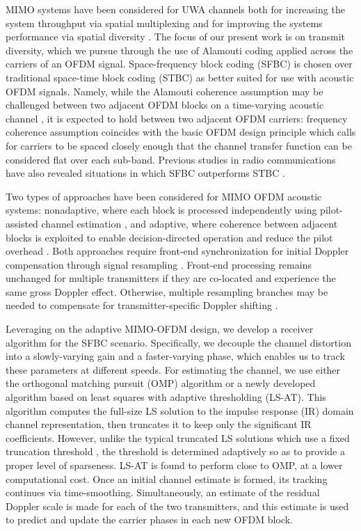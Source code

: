 MIMO systems have been considered for UWA channels both for increasing the system throughput via spatial multiplexing \cite{LiHu-MIMOOFDMhighrate, St-MIMOOFDMUWA} and for improving the systems performance via spatial diversity
\cite{LiSt-stbc}. The focus of our present work is on transmit diversity, which we pursue through the use of
Alamouti coding applied across the carriers of an OFDM signal. Space-frequency block coding
(SFBC) is chosen over traditional space-time block coding (STBC) as better suited for use with
acoustic OFDM signals. Namely, while the Alamouti coherence assumption \cite{Alamouti} may be challenged
between two adjacent OFDM blocks on a time-varying acoustic channel \cite{LiSt-stbc}, it is expected to hold
between two adjacent OFDM carriers: frequency coherence assumption coincides with the basic
OFDM design principle which calls for carriers to be spaced closely enough that the channel transfer
function can be considered flat over each sub-band. Previous studies in radio communications
have also revealed situations in which SFBC outperforms STBC \cite{LeWi-SFBCOFDM,LiCh-recperfDBC}.

Two types of approaches have been considered for MIMO OFDM acoustic systems: nonadaptive,
where each block is processed independently using pilot-assisted channel estimation \cite{LiHu-MIMOOFDMhighrate},
and adaptive, where coherence between adjacent blocks is exploited to enable decision-directed operation and reduce the pilot overhead \cite{St-MIMOOFDMUWA}. Both
approaches require front-end synchronization for initial Doppler compensation through signal
resampling \cite{LiZh-MulticarrierUWA}. Front-end processing remains unchanged for multiple transmitters if they are co-located and experience the same gross Doppler effect. Otherwise, multiple resampling branches
may be needed to compensate for transmitter-specific Doppler shifting \cite{TuDu-CoopMIMOOFDM}.

Leveraging on the adaptive MIMO-OFDM design, we develop a receiver algorithm for the
SFBC scenario. Specifically, we decouple the channel distortion into a slowly-varying gain and a
faster-varying phase, which enables us to track these parameters at different speeds. For estimating
the channel, we use either the orthogonal matching pursuit (OMP) algorithm \cite{LiPre-chanest} or a newly developed
algorithm based on least squares with adaptive thresholding (LS-AT). This algorithm
computes the full-size LS solution to the impulse response (IR) domain channel representation,
then truncates it to keep only the significant IR coefficients. However, unlike the typical truncated
LS solutions which use a fixed truncation threshold \cite{St-MIMOOFDMUWA}, the threshold is determined adaptively so
as to provide a proper level of sparseness. LS-AT is found to perform close to OMP, at a lower
computational cost. Once an initial channel estimate is formed, its tracking continues via time-smoothing. Simultaneously, an estimate of the residual Doppler scale is made for each of the two transmitters, and this estimate
is used to predict and update the carrier phases in each new OFDM block.

